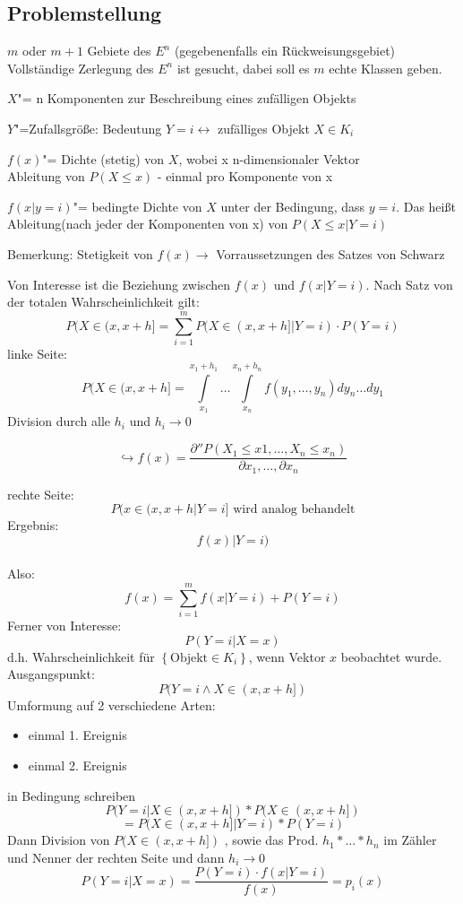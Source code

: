 \documentclass[a4paper,12pt]{scrreprt}
\begin{document}
\subsection{Problemstellung}
$m$ oder $m+1$ Gebiete des $E^n$ (gegebenenfalls ein
Rückweisungsgebiet)\\
Vollständige Zerlegung des $E^n$ ist gesucht, dabei soll es $m$ echte
Klassen geben.
\begin{description}
  \item{$X$}"= n Komponenten zur Beschreibung eines zufälligen Objekts
  \item{$Y$}"=Zufallsgröße: Bedeutung $Y=i\leftrightarrow$ zufälliges
Objekt $X\in K_i$
  \item{$f(x)$}"= Dichte (stetig) von $X$, wobei x n-dimensionaler Vektor\\
  Ableitung von $P(X \leq x)$ -  einmal pro Komponente von x
  \item{$f(x|y=i)$}"= bedingte Dichte von $X$ unter der Bedingung, dass
$y = i$. Das heißt Ableitung(nach jeder der Komponenten von x) von $P(X \leq x | Y = i)$
\item Bemerkung: Stetigkeit von $f(x)  \rightarrow$ Vorraussetzungen des Satzes von Schwarz 
\end{description}
Von Interesse ist die Beziehung zwischen $f(x)$ und $f(x|Y=i)$.
Nach Satz von der totalen Wahrscheinlichkeit gilt:\\
$$P(X\in(x,x+h{]}=\sum\limits^m_{i=1}P(X\in(x, x+h{]} |Y=i)\cdot
P(Y=i)$$
linke Seite:\\
$$P(X\in(x,x+h{]}=\int\limits^{x_1+h_1}_{x_1}\dots\int\limits^{x_n+h_n}_{x_n}
f(y_1,\dots,y_n)dy_n\dots dy_1$$
Division durch alle $h_i$ und $h_i \rightarrow 0$\\
\begin{large}
$$ \hookrightarrow f(x) = \frac{\partial''P(X_1 \leq x1 , \dots , X_n \leq x_n)}{\partial x_1 , \dots , \partial x_n}$$
\end{large}
rechte Seite:\\
$$ P( x \in (x,x+h| Y= i] \text{ wird analog behandelt}$$
Ergebnis: $$ f(x) | Y=i) $$\\
Also:
$$f(x)=\sum\limits_{i=1}^m f(x|Y=i)+P(Y=i)$$
Ferner von Interesse: $$P(Y=i| X=x)$$ d.h. Wahrscheinlichkeit für 
$\left\{ \text{Objekt}\in K_i \right\}$, wenn Vektor $x$ beobachtet
wurde.\\
Ausgangspunkt: $$P(Y=i \land X\in(x,x+h{]})$$
Umformung auf 2 verschiedene Arten:
\begin{itemize}
 \item einmal 1. Ereignis
 \item einmal 2. Ereignis 
\end{itemize}
in Bedingung schreiben\\
$$P(Y=i|X\in(x, x+h{]})*P(X\in(x, x+h{]})$$
$$=P(X\in(x, x+h{]}|Y=i)*P(Y=i)$$
Dann Division von $P(X\in(x, x+h{]})$ , sowie das Prod.
$h_1*\dots* h_n$ im Zähler und Nenner der rechten Seite und
dann $h_i\to0$\\
$$P(Y=i|X=x)=\frac{P(Y=i)\cdot f(x|Y=i)}{f(x)}=p_i(x)$$
\end{document}
